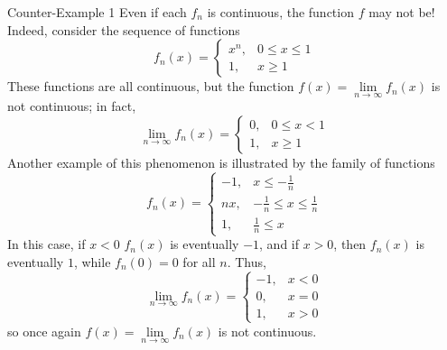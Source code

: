 \documentclass[12pt]{report}
\begin{document}
\begin{eg*}{Counter-Example 1}{}
    Even if each $f_n$ is continuous, the function $f$ may not be! Indeed, consider the sequence of functions \begin{equation*}
        f_n(x) = \left\{\begin{array}{lc} x^n, & 0\leq x \leq 1 \\ 1, & x \geq 1 \end{array}\right.
    \end{equation*}
    These functions are all continuous, but the function $f(x) = \lim\limits_{n\rightarrow \infty}f_n(x)$ is not continuous; in fact, \begin{equation*}
        \lim\limits_{n\rightarrow \infty}f_n(x) = \left\{\begin{array}{lc} 0, & 0\leq x < 1 \\ 1, & x \geq 1 \end{array}\right.
    \end{equation*}
    Another example of this phenomenon is illustrated by the family of functions \begin{equation*}
        f_n(x) = \left\{\begin{array}{lc} -1, &  x \leq -\frac{1}{n} \\ nx, & -\frac{1}{n} \leq x \leq \frac{1}{n} \\ 1, & \frac{1}{n} \leq x \end{array}\right.
    \end{equation*}
    In this case, if $x < 0$ $f_n(x)$ is eventually $-1$, and if $x > 0$, then $f_n(x)$ is eventually $1$, while $f_n(0) = 0$ for all $n$. Thus, \begin{equation*}
        \lim\limits_{n\rightarrow \infty}f_n(x) = \left\{\begin{array}{lc} -1, & x < 0 \\ 0, & x = 0 \\ 1, & x > 0 \end{array}\right.
    \end{equation*}
    so once again $f(x) = \lim\limits_{n\rightarrow \infty}f_n(x)$ is not continuous.
\end{eg*}
\end{document}
